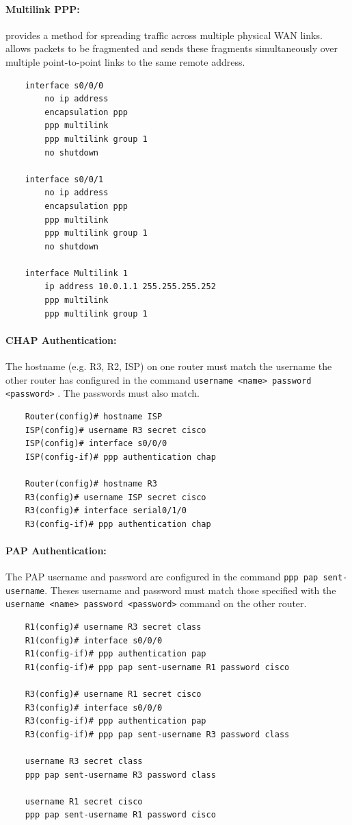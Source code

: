\paragraph{Multilink PPP:} provides a method for spreading traffic across multiple physical WAN links. allows packets to be fragmented and sends these fragments simultaneously over multiple point-to-point links to the same remote address. 
	\begin{verbatim}
	interface s0/0/0
		no ip address
		encapsulation ppp
		ppp multilink	
		ppp multilink group 1
		no shutdown
		
	interface s0/0/1
		no ip address
		encapsulation ppp
		ppp multilink	
		ppp multilink group 1
		no shutdown
		
	interface Multilink 1
		ip address 10.0.1.1 255.255.255.252
		ppp multilink	
		ppp multilink group 1			
	\end{verbatim}
	
\paragraph{CHAP Authentication:} The hostname (e.g. R3, R2, ISP) on one router must match the username the other router has configured in the command \verb|username <name> password <password>| . The passwords must also match.
	\begin{verbatim}
	Router(config)# hostname ISP
	ISP(config)# username R3 secret cisco
	ISP(config)# interface s0/0/0
	ISP(config-if)# ppp authentication chap
	
	Router(config)# hostname R3
	R3(config)# username ISP secret cisco
	R3(config)# interface serial0/1/0
	R3(config-if)# ppp authentication chap	
	\end{verbatim}
	
\paragraph{PAP Authentication:} The PAP username and password are configured in the command \verb|ppp pap sent-username|. Theses username and password must match those specified with the \verb|username <name> password <password>| command on the other router.
	\begin{verbatim}
	R1(config)# username R3 secret class
	R1(config)# interface s0/0/0
	R1(config-if)# ppp authentication pap
	R1(config-if)# ppp pap sent-username R1 password cisco
	
	R3(config)# username R1 secret cisco
	R3(config)# interface s0/0/0
	R3(config-if)# ppp authentication pap
	R3(config-if)# ppp pap sent-username R3 password class	
	
	username R3 secret class
	ppp pap sent-username R3 password class
	
	username R1 secret cisco
	ppp pap sent-username R1 password cisco
	\end{verbatim}